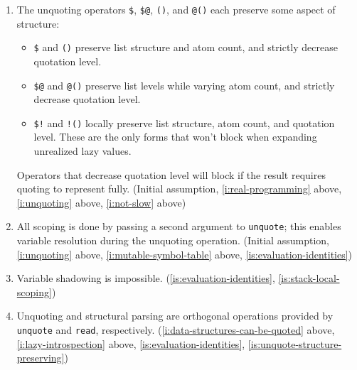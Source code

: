 \documentclass{report}
\begin{document}
\begin{enumerate}
\item{}\label{is:unquote-structure-preserving}
  The unquoting operators \verb|$|, \verb|$@|, \verb|()|, and \verb|@()|
  each preserve some aspect of structure:
\begin{itemize}
\item{}
  \verb|$| and \verb|()| preserve list structure and atom count, and
  strictly decrease quotation level.
\item{}
  \verb|$@| and \verb|@()| preserve list levels while varying atom
  count, and strictly decrease quotation level.
\item{}
  \verb|$!| and \verb|!()| locally preserve list structure, atom count,
  and quotation level. These are the only forms that won't block when
  expanding unrealized lazy values.
\end{itemize}
  Operators that decrease quotation level will block if the result requires
  quoting to represent fully.
    (Initial assumption,
     \ref{i:real-programming} above,
     \ref{i:unquoting} above,
     \ref{i:not-slow} above)
\item{}\label{is:stack-local-scoping}
  All scoping is done by passing a second argument to {\tt unquote}; this
  enables variable resolution during the unquoting operation.
    (Initial assumption,
     \ref{i:unquoting} above,
     \ref{i:mutable-symbol-table} above,
     \ref{is:evaluation-identities})
\item{}\label{is:no-variable-shadowing}
  Variable shadowing is impossible.
    (\ref{is:evaluation-identities},
     \ref{is:stack-local-scoping})
\item{}\label{is:unquoting-vs-parsing}
  Unquoting and structural parsing are orthogonal operations provided by
  {\tt unquote} and {\tt read}, respectively.
    (\ref{i:data-structures-can-be-quoted} above,
     \ref{i:lazy-introspection} above,
     \ref{is:evaluation-identities},
     \ref{is:unquote-structure-preserving})


\end{enumerate}
\end{document}
